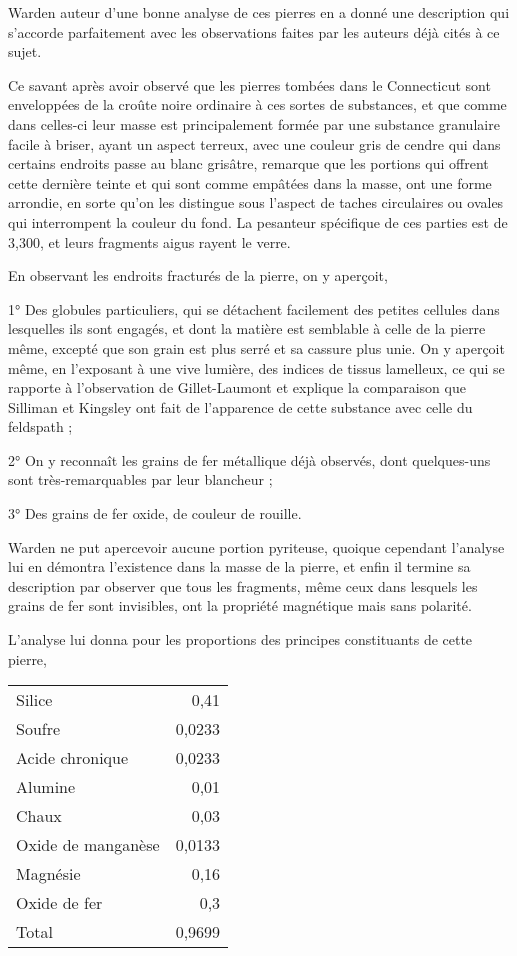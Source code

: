 \documentclass[a4paper, 12pt, oneside, french]{article}
\begin{document}
Warden auteur d'une bonne analyse de ces pierres en a donné une description qui s'accorde parfaitement avec les observations faites par les auteurs déjà cités à ce sujet.

Ce savant après avoir observé que les pierres tombées dans le Connecticut sont enveloppées de la croûte noire ordinaire à ces sortes de substances, et que comme dans celles-ci leur masse est principalement formée par une substance granulaire facile à briser, ayant un aspect terreux, avec une couleur gris de cendre qui dans certains endroits passe au blanc grisâtre, remarque que les portions qui offrent cette dernière teinte et qui sont comme empâtées dans la masse, ont une forme arrondie, en sorte qu'on les distingue sous l'aspect de taches circulaires ou ovales qui interrompent la couleur du fond. La pesanteur spécifique de ces parties est de 3,300, et leurs fragments aigus rayent le verre.

En observant les endroits fracturés de la pierre, on y aperçoit,

1° Des globules particuliers, qui se détachent facilement des petites cellules dans lesquelles ils sont engagés, et dont la matière est semblable à celle de la pierre même, excepté que son grain est plus serré et sa cassure plus unie. On y aperçoit même, en l'exposant à une vive lumière, des indices de tissus lamelleux, ce qui se rapporte à l'observation de Gillet-Laumont et explique la comparaison que Silliman et Kingsley ont fait de l'apparence de cette substance avec celle du feldspath ;

2° On y reconnaît les grains de fer métallique déjà observés, dont quelques-uns sont très-remarquables par leur blancheur ;

3° Des grains de fer oxide, de couleur de rouille.

Warden ne put apercevoir aucune portion pyriteuse, quoique cependant l'analyse lui en démontra l'existence dans la masse de la pierre, et enfin il termine sa description par observer que tous les fragments, même ceux dans lesquels les grains de fer sont invisibles, ont la propriété magnétique mais sans polarité.

L'analyse lui donna pour les proportions des principes constituants de cette pierre,
\begin{table}[H]
    \centering
    \begin{tabular}{l r}
        Silice & 0,41 \\
        Soufre & 0,0233 \\
        Acide chronique & 0,0233 \\
        Alumine & 0,01 \\
        Chaux & 0,03 \\
        Oxide de manganèse & 0,0133 \\
        Magnésie & 0,16 \\
        Oxide de fer & 0,3 \\ \hline
        Total & 0,9699 \\
    \end{tabular}
\end{table}
\end{document}
